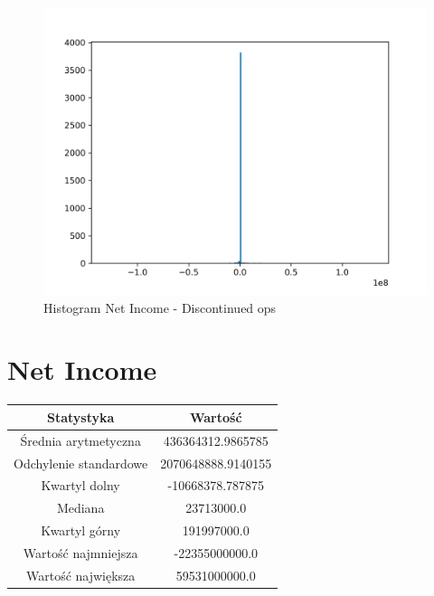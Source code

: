 \documentclass{article}
\begin{document}
\begin{figure}[h!]
    \includegraphics[width=\linewidth]{variables/Net Income - Discontinued ops.png}
    \caption{Histogram Net Income - Discontinued ops }
\end{figure}\section{ Net Income }

\begin{center}
    \begin{tabular}{|c | c|} 
    \hline
    Statystyka & Wartość \\
    \hline\hline
    Średnia arytmetyczna & 436364312.9865785 \\ 
    \hline
    Odchylenie standardowe & 2070648888.9140155 \\
    \hline
    Kwartyl dolny & -10668378.787875 \\
    \hline
    Mediana & 23713000.0 \\
    \hline
    Kwartyl górny & 191997000.0 \\
    \hline
    Wartość najmniejsza & -22355000000.0 \\
    \hline
    Wartość największa & 59531000000.0 \\
    \hline
   \end{tabular}
\end{center}
\end{document}
